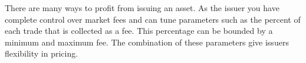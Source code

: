 There are many ways to profit from issuing an asset. As the issuer you have
complete control over market fees and can tune parameters such as the percent
of each trade that is collected as a fee. This percentage can be bounded by a
minimum and maximum fee. The combination of these parameters give issuers
flexibility in pricing.

